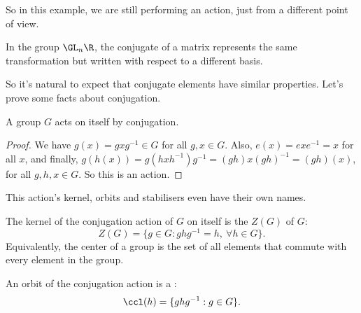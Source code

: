 \documentclass[a4]{scrreprt}
\begin{document}
\begin{example}
\begin{center}

	\end{center}
	So in this example, we are still performing an action, just from a different point of view.
\end{example}

\begin{example}
	In the group $\GL_n \R$, the conjugate of a matrix represents the same transformation but written with respect to a different basis.
\end{example}

So it's natural to expect that conjugate elements have similar properties. Let's prove some facts about conjugation.

\begin{proposition}
	A group $G$ acts on itself by conjugation.
\end{proposition}
\begin{proof}
	We have $g(x) = gxg^{-1} \in G$ for all $g, x \in G$. Also, $e(x) = e x e^{-1} = x$ for all $x$, and finally, $g(h(x)) = g(h xh^{-1})g^{-1} = (gh) x (gh)^{-1} = (gh)(x)$, for all $g, h, x \in G$. So this is an action.
\end{proof}

This action's kernel, orbits and stabilisers even have their own names.

\begin{definition}[Center]
	The kernel of the conjugation action of $G$ on itself is the  $Z(G)$ of $G$:
	$$
Z(G) = \{g \in G : ghg^{-1} = h, \ \forall h \in G\}.
	$$
	Equivalently, the center of a group is the set of all elements that commute with every element in the group.
\end{definition}
\begin{definition}
	An orbit of the conjugation action is a :
	$$
\ccl(h) = \{ ghg^{-1} : g \in G \}.
	$$
\end{definition}
\end{document}
